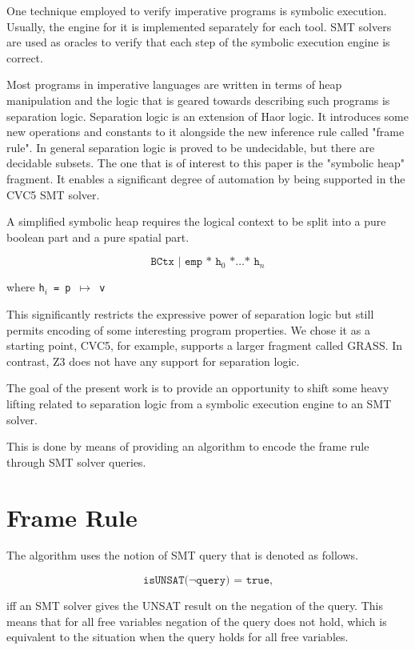 \documentclass[sigplan,screen,review]{acmart}
\begin{document}
One technique employed to verify imperative programs is symbolic execution\cite{berdine2005symbolic}. Usually, the engine for it is implemented separately for each tool\cite{berdine2006smallfoot}\cite{distefano2008jstar}. SMT solvers are used as oracles to verify that each step of the symbolic execution engine is correct. 

Most programs in imperative languages are written in terms of heap manipulation and the logic that is geared towards describing such programs is separation logic\cite{o2019separation}. Separation logic is an extension of Haor logic\cite{hoare1969axiomatic}. It introduces some new operations and constants to it alongside the new inference rule called "frame rule". In general separation logic is proved to be undecidable\cite{brotherston2010undecidability}, but there are decidable subsets. The one that is of interest to this paper is the "symbolic heap" fragment\cite{berdine2006smallfoot}. It enables a significant degree of automation by being supported in the CVC5 SMT solver\cite{piskac2013automating}.  

A simplified symbolic heap requires the logical context to be split into a pure boolean part and a pure spatial part. 

\[
\texttt{BCtx | emp * h$_0$ *$\dots$* h$_n$}
\]

where \texttt{h$_i$ = p $\mapsto$ v}

This significantly restricts the expressive power of separation logic but still permits encoding of some interesting program properties. We chose it as a starting point, CVC5, for example, supports a larger fragment called GRASS\cite{piskac2013automating}. In contrast, Z3 does not have any support for separation logic. 

The goal of the present work is to provide an opportunity to shift some heavy lifting related to separation logic from a symbolic execution engine to an SMT solver. 

This is done by means of providing an algorithm to encode the frame rule through SMT solver queries. 

\section{Frame Rule}


The algorithm uses the notion of SMT query that is denoted as follows.

\[
\texttt{isUNSAT($\neg$query) = true,}
\]

iff an SMT solver gives the UNSAT result on the negation of the query. This means that for all free variables negation of the query does not hold, which is equivalent to the situation when the query holds for all free variables. 
\end{document}

